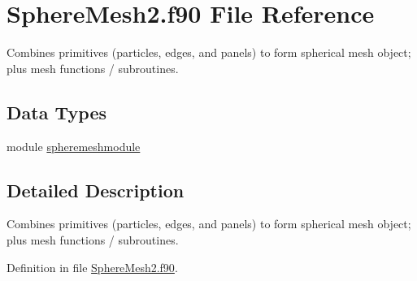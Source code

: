 \hypertarget{SphereMesh2_8f90}{\section{Sphere\+Mesh2.\+f90 File Reference}
\label{SphereMesh2_8f90}
}


Combines primitives (particles, edges, and panels) to form spherical mesh object; plus mesh functions / subroutines.  


\subsection*{Data Types}
\begin{DoxyCompactItemize}
\item 
module \hyperlink{classspheremeshmodule}{spheremeshmodule}
\end{DoxyCompactItemize}


\subsection{Detailed Description}
Combines primitives (particles, edges, and panels) to form spherical mesh object; plus mesh functions / subroutines. 



Definition in file \hyperlink{SphereMesh2_8f90_source}{Sphere\+Mesh2.\+f90}.

